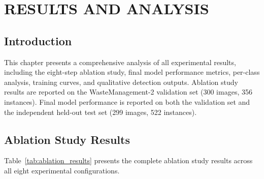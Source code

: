 \chapter{RESULTS AND ANALYSIS}

\section{Introduction}

This chapter presents a comprehensive analysis of all experimental results, including the eight-step ablation study, final model performance metrics, per-class analysis, training curves, and qualitative detection outputs. Ablation study results are reported on the WasteManagement-2 validation set (300 images, 356 instances). Final model performance is reported on both the validation set and the independent held-out test set (299 images, 522 instances).

\section{Ablation Study Results}

Table~\ref{tab:ablation_results} presents the complete ablation study results across all eight experimental configurations.

\begin{table}[H]
\centering
\caption{Complete Ablation Study Results}
\label{tab:ablation_results}
\end{table}

